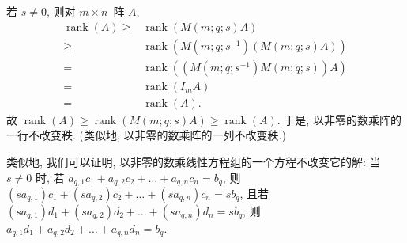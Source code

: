 \documentclass[../libro.tex]{subfiles}
\begin{document}
若 \(s \neq 0\), 则对 \(m \times n\)~阵 \(A\),
\begin{align*}
    \operatorname{rank} {(A)}
    \geq {} &
    \operatorname{rank} {(M(m; q; s) A)}
    \\
    \geq {} &
    \operatorname{rank}
    {(M(m; q; s^{-1}) (M(m; q; s) A))}
    \\
    = {} &
    \operatorname{rank}
    {((M(m; q; s^{-1}) M(m; q; s)) A)}
    \\
    = {} &
    \operatorname{rank} {(I_m A)}
    \\
    = {} &
    \operatorname{rank} {(A)}.
\end{align*}
故 \(\operatorname{rank} {(A)}
    \geq \operatorname{rank} {(M(m; q; s) A)}
\geq \operatorname{rank} {(A)}\).
于是, 以非零的数乘阵的一行不改变秩.
(类似地, 以非零的数乘阵的一列不改变秩.)


类似地, 我们可以证明,
以非零的数乘线性方程组的一个方程不改变它的解:
当 \(s \neq 0\) 时,
若
\(a_{q,1} c_1 + a_{q,2} c_2 + \dots + a_{q,n} c_n = b_q\),
则
\((s a_{q,1}) c_1 + (s a_{q,2}) c_2 + \dots + (s a_{q,n}) c_n
= s b_q\),
且若
\((s a_{q,1}) d_1 + (s a_{q,2}) d_2 + \dots + (s a_{q,n}) d_n
= s b_q\),
则
\(a_{q,1} d_1 + a_{q,2} d_2 + \dots + a_{q,n} d_n = b_q\).
\end{document}
